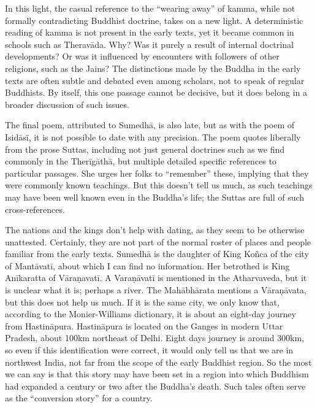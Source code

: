 \documentclass[12pt,openany]{book}%
\begin{document}
In this light, the casual reference to the “wearing away” of kamma, while not formally contradicting Buddhist doctrine, takes on a new light. A deterministic reading of kamma is not present in the early texts, yet it became common in schools such as \textsanskrit{Theravāda}. Why? Was it purely a result of internal doctrinal developments? Or was it influenced by encounters with followers of other religions, such as the Jains? The distinctions made by the Buddha in the early texts are often subtle and debated even among scholars, not to speak of regular Buddhists. By itself, this one passage cannot be decisive, but it does belong in a broader discussion of such issues.

The final poem, attributed to \textsanskrit{Sumedhā}, is also late, but as with the poem of \textsanskrit{Isidāsī}, it is not possible to date with any precision. The poem quotes liberally from the prose Suttas, including not just general doctrines such as we find commonly in the \textsanskrit{Therīgāthā}, but multiple detailed specific references to particular passages. She urges her folks to “remember” these, implying that they were commonly known teachings. But this doesn’t tell us much, as such teachings may have been well known even in the Buddha’s life; the Suttas are full of such cross-references.

The nations and the kings don’t help with dating, as they seem to be otherwise unattested. Certainly, they are not part of the normal roster of places and people familiar from the early texts. \textsanskrit{Sumedhā} is the daughter of King \textsanskrit{Koñca} of the city of \textsanskrit{Mantāvatī}, about which I can find no information. Her betrothed is King \textsanskrit{Anīkaratta} of \textsanskrit{Vāraṇavatī}. A \textsanskrit{Varaṇāvatī} is mentioned in the Atharvaveda, but it is unclear what it is; perhaps a river. The \textsanskrit{Mahābhārata} mentions a \textsanskrit{Vāraṇāvata}, but this does not help us much. If it is the same city, we only know that, according to the Monier-Williams dictionary, it is about an eight-day journey from \textsanskrit{Hastināpura}. \textsanskrit{Hastināpura} is located on the Ganges in modern Uttar Pradesh, about 100km northeast of Delhi. Eight days journey is around 300km, so even if this identification were correct, it would only tell us that we are in northwest India, not far from the scope of the early Buddhist region. So the most we can say is that this story may have been set in a region into which Buddhism had expanded a century or two after the Buddha’s death. Such tales often serve as the “conversion story” for a country.
\end{document}
